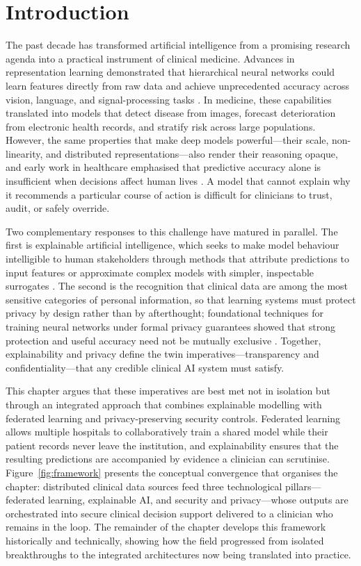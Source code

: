 \documentclass[11pt,a4paper]{article}
\begin{document}
\section{Introduction}
The past decade has transformed artificial intelligence from a promising
research agenda into a practical instrument of clinical medicine. Advances in
representation learning demonstrated that hierarchical neural networks could
learn features directly from raw data and achieve unprecedented accuracy across
vision, language, and signal-processing tasks \cite{ref1}. In medicine, these
capabilities translated into models that detect disease from images, forecast
deterioration from electronic health records, and stratify risk across large
populations. However, the same properties that make deep models powerful---their
scale, non-linearity, and distributed representations---also render their
reasoning opaque, and early work in healthcare emphasised that predictive
accuracy alone is insufficient when decisions affect human lives \cite{ref2}. A
model that cannot explain why it recommends a particular course of action is
difficult for clinicians to trust, audit, or safely override.

Two complementary responses to this challenge have matured in parallel. The
first is explainable artificial intelligence, which seeks to make model
behaviour intelligible to human stakeholders through methods that attribute
predictions to input features or approximate complex models with simpler,
inspectable surrogates \cite{ref3}. The second is the recognition that clinical
data are among the most sensitive categories of personal information, so that
learning systems must protect privacy by design rather than by afterthought;
foundational techniques for training neural networks under formal privacy
guarantees showed that strong protection and useful accuracy need not be
mutually exclusive \cite{ref4}. Together, explainability and privacy define the
twin imperatives---transparency and confidentiality---that any credible clinical
AI system must satisfy.

This chapter argues that these imperatives are best met not in isolation but
through an integrated approach that combines explainable modelling with
federated learning and privacy-preserving security controls. Federated learning
allows multiple hospitals to collaboratively train a shared model while their
patient records never leave the institution, and explainability ensures that the
resulting predictions are accompanied by evidence a clinician can scrutinise.
Figure~\ref{fig:framework} presents the conceptual convergence that organises the
chapter: distributed clinical data sources feed three technological
pillars---federated learning, explainable AI, and security and
privacy---whose outputs are orchestrated into secure clinical decision support
delivered to a clinician who remains in the loop. The remainder of the chapter
develops this framework historically and technically, showing how the field
progressed from isolated breakthroughs to the integrated architectures now being
translated into practice.
\end{document}
